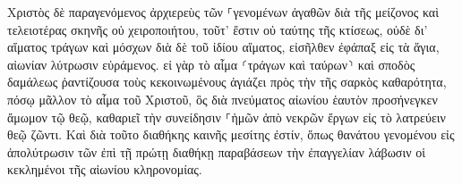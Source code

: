 \documentclass{openreader}
\begin{document}
Χριστὸς δὲ παραγενόμενος ἀρχιερεὺς τῶν ⸀γενομένων ἀγαθῶν διὰ τῆς μείζονος καὶ τελειοτέρας σκηνῆς οὐ χειροποιήτου, τοῦτ’ ἔστιν οὐ ταύτης τῆς κτίσεως, 
οὐδὲ δι’ αἵματος τράγων καὶ μόσχων διὰ δὲ τοῦ ἰδίου αἵματος, εἰσῆλθεν ἐφάπαξ εἰς τὰ ἅγια, αἰωνίαν λύτρωσιν εὑράμενος. 
εἰ γὰρ τὸ αἷμα ⸂τράγων καὶ ταύρων⸃ καὶ σποδὸς δαμάλεως ῥαντίζουσα τοὺς κεκοινωμένους ἁγιάζει πρὸς τὴν τῆς σαρκὸς καθαρότητα, 
πόσῳ μᾶλλον τὸ αἷμα τοῦ Χριστοῦ, ὃς διὰ πνεύματος αἰωνίου ἑαυτὸν προσήνεγκεν ἄμωμον τῷ θεῷ, καθαριεῖ τὴν συνείδησιν ⸀ἡμῶν ἀπὸ νεκρῶν ἔργων εἰς τὸ λατρεύειν θεῷ ζῶντι. 
Καὶ διὰ τοῦτο διαθήκης καινῆς μεσίτης ἐστίν, ὅπως θανάτου γενομένου εἰς ἀπολύτρωσιν τῶν ἐπὶ τῇ πρώτῃ διαθήκῃ παραβάσεων τὴν ἐπαγγελίαν λάβωσιν οἱ κεκλημένοι τῆς αἰωνίου κληρονομίας. 
\end{document}

